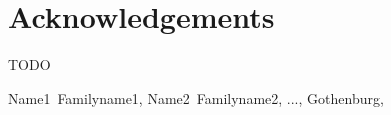 \thispagestyle{plain}			%
\section*{Acknowledgements}
TODO

\vspace{1.5cm}
\hfill
Name1~Familyname1, Name2~Familyname2, ..., Gothenburg, \monthname \space \the\year

\newpage				%
\thispagestyle{empty}
\mbox{}